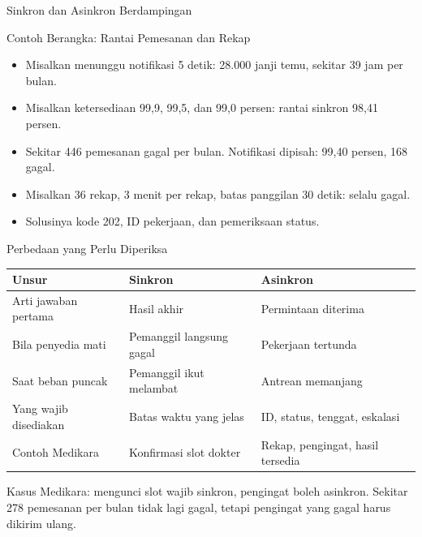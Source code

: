 \documentclass[aspectratio=169, table, 12pt]{beamer}
\begin{document}
\begin{frame}{{\Large Sinkron dan Asinkron Berdampingan}}
  \centering
\end{frame}

\begin{frame}{{\Large Contoh Berangka: Rantai Pemesanan dan Rekap}}
  \vspace{10pt}
  \begin{itemize}
    \item Misalkan menunggu notifikasi 5 detik: 28.000 janji temu, sekitar 39 jam per bulan.
    \item Misalkan ketersediaan 99,9, 99,5, dan 99,0 persen: rantai sinkron 98,41 persen.
    \item Sekitar 446 pemesanan gagal per bulan. Notifikasi dipisah: 99,40 persen, 168 gagal.
    \item Misalkan 36 rekap, 3 menit per rekap, batas panggilan 30 detik: selalu gagal.
    \item Solusinya kode 202, ID pekerjaan, dan pemeriksaan status.
  \end{itemize}
\end{frame}

\begin{frame}{{\Large Perbedaan yang Perlu Diperiksa}}
  \small
  \begin{tabularx}{\textwidth}{>{\raggedright\arraybackslash}p{3.6cm}
      >{\raggedright\arraybackslash}X >{\raggedright\arraybackslash}X}
    \hline
    \textbf{Unsur} & \textbf{Sinkron} & \textbf{Asinkron} \\ \hline
    Arti jawaban pertama & Hasil akhir & Permintaan diterima \\ \hline
    Bila penyedia mati & Pemanggil langsung gagal & Pekerjaan tertunda \\ \hline
    Saat beban puncak & Pemanggil ikut melambat & Antrean memanjang \\ \hline
    Yang wajib disediakan & Batas waktu yang jelas & ID, status, tenggat, eskalasi \\ \hline
    Contoh Medikara & Konfirmasi slot dokter & Rekap, pengingat, hasil tersedia \\ \hline
  \end{tabularx}

  \vspace{6pt}
  Kasus Medikara: mengunci slot wajib sinkron, pengingat boleh asinkron. Sekitar 278 pemesanan per bulan tidak lagi gagal, tetapi pengingat yang gagal harus dikirim ulang.
\end{frame}
\end{document}
